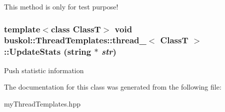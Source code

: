 This method is only for test purpose! 

\hypertarget{classbuskol_1_1ThreadTemplates_1_1thread__1_ab97928f6c8b8c75b33ffd6e57514d692}{
\subsubsection[{UpdateStats}]{\setlength{\rightskip}{0pt plus 5cm}template$<$class ClassT$>$ void {\bf buskol::ThreadTemplates::thread\_}$<$ ClassT $>$::UpdateStats (string $\ast$ {\em str})}}
\label{classbuskol_1_1ThreadTemplates_1_1thread__1_ab97928f6c8b8c75b33ffd6e57514d692}


Push statistic information 



The documentation for this class was generated from the following file:\begin{DoxyCompactItemize}
\item 
myThreadTemplates.hpp\end{DoxyCompactItemize}
